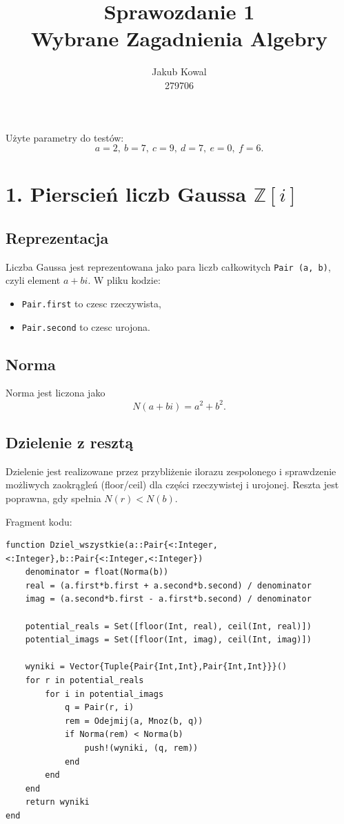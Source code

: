 \documentclass[12pt,a4paper]{article}
\title{\textbf{Sprawozdanie 1}\\Wybrane Zagadnienia Algebry}
\author{Jakub Kowal\\279706}
\date{}
\begin{document}
\maketitle

Użyte parametry do testów:
\[
a=2,\ b=7,\ c=9,\ d=7,\ e=0,\ f=6.
\]

\section*{1. Pierscień liczb Gaussa $\mathbb{Z}[i]$}

\subsection*{Reprezentacja}
Liczba Gaussa jest reprezentowana jako para liczb całkowitych \texttt{Pair (a, b)},
czyli element $a+bi$.
W pliku kodzie:
\begin{itemize}
\item \texttt{Pair.first} to czesc rzeczywista,
\item \texttt{Pair.second} to czesc urojona.
\end{itemize}

\subsection*{Norma}
Norma jest liczona jako
\[
N(a+bi)=a^2+b^2.
\]

\subsection*{Dzielenie z resztą}
Dzielenie jest realizowane przez przybliżenie ilorazu zespolonego i sprawdzenie
możliwych zaokrągleń (floor/ceil) dla części rzeczywistej i urojonej.
Reszta jest poprawna, gdy spełnia $N(r) < N(b)$.

Fragment kodu:
\begin{verbatim}
function Dziel_wszystkie(a::Pair{<:Integer,<:Integer},b::Pair{<:Integer,<:Integer})
	denominator = float(Norma(b))
	real = (a.first*b.first + a.second*b.second) / denominator
	imag = (a.second*b.first - a.first*b.second) / denominator

	potential_reals = Set([floor(Int, real), ceil(Int, real)])
	potential_imags = Set([floor(Int, imag), ceil(Int, imag)])

	wyniki = Vector{Tuple{Pair{Int,Int},Pair{Int,Int}}}()
	for r in potential_reals
		for i in potential_imags
			q = Pair(r, i)
			rem = Odejmij(a, Mnoz(b, q))
			if Norma(rem) < Norma(b)
				push!(wyniki, (q, rem))
			end
		end
	end
	return wyniki
end
\end{verbatim}
\end{document}
